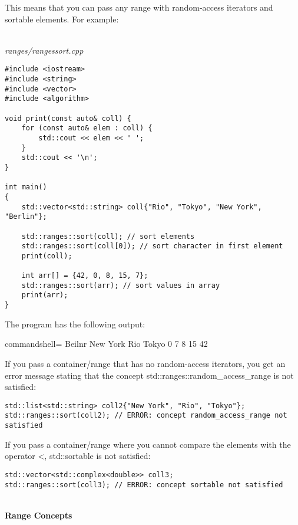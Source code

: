 This means that you can pass any range with random-access iterators and sortable elements. For example:

\noindent
\hspace*{\fill} \\ %
\textit{ranges/rangessort.cpp}

\begin{lstlisting}[style=styleCXX]
#include <iostream>
#include <string>
#include <vector>
#include <algorithm>

void print(const auto& coll) {
	for (const auto& elem : coll) {
		std::cout << elem << ' ';
	}
	std::cout << '\n';
}

int main()
{
	std::vector<std::string> coll{"Rio", "Tokyo", "New York", "Berlin"};
	
	std::ranges::sort(coll); // sort elements
	std::ranges::sort(coll[0]); // sort character in first element
	print(coll);
	
	int arr[] = {42, 0, 8, 15, 7};
	std::ranges::sort(arr); // sort values in array
	print(arr);
}
\end{lstlisting}

The program has the following output:

\begin{tcblisting}{commandshell={}}
Beilnr New York Rio Tokyo
0 7 8 15 42
\end{tcblisting}

If you pass a container/range that has no random-access iterators, you get an error message stating that the concept std::ranges::random\_access\_range is not satisfied:

\begin{lstlisting}[style=styleCXX]
std::list<std::string> coll2{"New York", "Rio", "Tokyo"};
std::ranges::sort(coll2); // ERROR: concept random_access_range not satisfied
\end{lstlisting}

If you pass a container/range where you cannot compare the elements with the operator <, std::sortable is not satisfied:

\begin{lstlisting}[style=styleCXX]
std::vector<std::complex<double>> coll3;
std::ranges::sort(coll3); // ERROR: concept sortable not satisfied
\end{lstlisting}

\noindent
\hspace*{\fill} \\ %
\textbf{Range Concepts}

